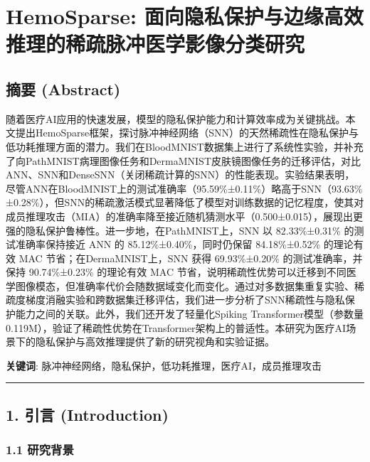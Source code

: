 \documentclass[
]{article}
\author{}
\date{}
\begin{document}
{
\setcounter{tocdepth}{3}
\tableofcontents
}
\section{HemoSparse:
面向隐私保护与边缘高效推理的稀疏脉冲医学影像分类研究}\label{hemosparse-ux9762ux5411ux9690ux79c1ux4fddux62a4ux4e0eux8fb9ux7f18ux9ad8ux6548ux63a8ux7406ux7684ux7a00ux758fux8109ux51b2ux533bux5b66ux5f71ux50cfux5206ux7c7bux7814ux7a76}

\subsection{摘要 (Abstract)}\label{ux6458ux8981-abstract}

随着医疗AI应用的快速发展，模型的隐私保护能力和计算效率成为关键挑战。本文提出HemoSparse框架，探讨脉冲神经网络（SNN）的天然稀疏性在隐私保护与低功耗推理方面的潜力。我们在BloodMNIST数据集上进行了系统性实验，并补充了向PathMNIST病理图像任务和DermaMNIST皮肤镜图像任务的迁移评估，对比ANN、SNN和DenseSNN（关闭稀疏计算的SNN）的性能表现。实验结果表明，尽管ANN在BloodMNIST上的测试准确率（95.59\%±0.11\%）略高于SNN（93.63\%±0.28\%），但SNN的稀疏激活模式显著降低了模型对训练数据的记忆程度，使其对成员推理攻击（MIA）的准确率降至接近随机猜测水平（0.500±0.015），展现出更强的隐私保护鲁棒性。进一步地，在PathMNIST上，SNN
以 82.33\%±0.31\% 的测试准确率保持接近 ANN 的 85.12\%±0.40\%，同时仍保留
84.18\%±0.52\% 的理论有效 MAC 节省；在DermaMNIST上，SNN 获得
69.93\%±0.20\% 的测试准确率，并保持 90.74\%±0.23\% 的理论有效 MAC
节省，说明稀疏性优势可以迁移到不同医学图像模态，但准确率代价会随数据域变化而变化。通过对多数据集重复实验、稀疏度梯度消融实验和跨数据集迁移评估，我们进一步分析了SNN稀疏性与隐私保护能力之间的关联。此外，我们还开发了轻量化Spiking
Transformer模型（参数量0.119M），验证了稀疏性优势在Transformer架构上的普适性。本研究为医疗AI场景下的隐私保护与高效推理提供了新的研究视角和实验证据。

\textbf{关键词}:
脉冲神经网络，隐私保护，低功耗推理，医疗AI，成员推理攻击

\begin{center}\rule{0.5\linewidth}{0.5pt}\end{center}

\subsection{1. 引言 (Introduction)}\label{ux5f15ux8a00-introduction}

\subsubsection{1.1 研究背景}\label{ux7814ux7a76ux80ccux666f}
\end{document}
